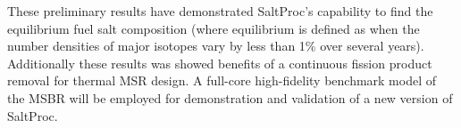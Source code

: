 These preliminary results have demonstrated SaltProc's capability to find 
the equilibrium fuel salt 
composition (where equilibrium is defined as when the number densities of major 
isotopes vary by less than 1\% over several years). Additionally these results
was showed benefits of a continuous fission product removal for 
thermal \gls{MSR} design. A full-core high-fidelity benchmark model 
of the \gls{MSBR} will be employed for demonstration and validation of a new 
version of SaltProc.